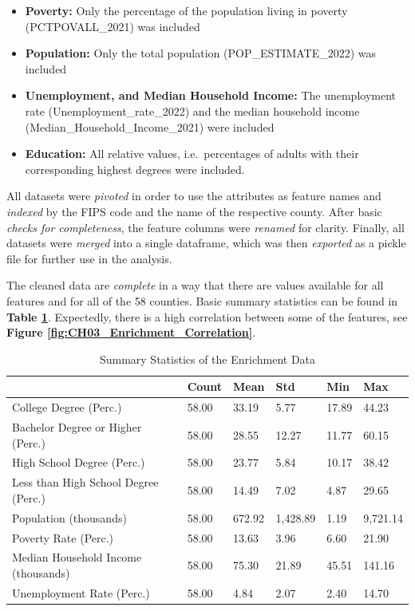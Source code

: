 \begin{itemize}
    \item \textbf{Poverty:} Only the percentage of the population living in poverty (PCTPOVALL\_2021) was included
    \item \textbf{Population:} Only the total population (POP\_ESTIMATE\_2022) was included
    \item \textbf{Unemployment, and Median Household Income:} The unemployment rate (Unemployment\_rate\_2022) and the median household income (Median\_Household\_Income\_2021) were included
    \item \textbf{Education:} All relative values, i.e.\ percentages of adults with their corresponding highest degrees were included.
\end{itemize}

All datasets were \textit{pivoted} in order to use the attributes as feature names and \textit{indexed} by the FIPS code and the name of the respective county. After basic \textit{checks for completeness}, the feature columns were \textit{renamed} for clarity. Finally, all datasets were \textit{merged} into a single dataframe, which was then \textit{exported} as a pickle file for further use in the analysis.


The cleaned data are \textit{complete} in a way that there are values available for all features and for all of the 58 counties. Basic summary statistics can be found in \textbf{Table \ref{tab:enrichment_summary}}. Expectedly, there is a high correlation between some of the features, see \textbf{Figure \ref{fig:CH03_Enrichment_Correlation}}.

\begin{table}[h]
    \centering
    \begin{tabularx}{\textwidth}{llllll}
    \hline
     & \textbf{Count} & \textbf{Mean} & \textbf{Std} & \textbf{Min} & \textbf{Max} \\
    \hline
    College Degree (Perc.) & 58.00 & 33.19 & 5.77 & 17.89 & 44.23 \\
    \hline
    Bachelor Degree or Higher (Perc.) & 58.00 & 28.55 & 12.27 & 11.77 & 60.15 \\
    \hline
    High School Degree (Perc.) & 58.00 & 23.77 & 5.84 & 10.17 & 38.42 \\
    \hline
    Less than High School Degree (Perc.) & 58.00 & 14.49 & 7.02 & 4.87 & 29.65 \\
    \hline
    Population (thousands) & 58.00 & 672.92 & 1,428.89 & 1.19 & 9,721.14 \\
    \hline
    Poverty Rate (Perc.) & 58.00 & 13.63 & 3.96 & 6.60 & 21.90 \\
    \hline
    Median Household Income (thousands) & 58.00 & 75.30 & 21.89 & 45.51 & 141.16 \\
    \hline
    Unemployment Rate (Perc.) & 58.00 & 4.84 & 2.07 & 2.40 & 14.70 \\
    \hline
    \end{tabularx}
    \caption{Summary Statistics of the Enrichment Data}
    \label{tab:enrichment_summary}
\end{table}

